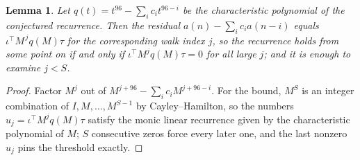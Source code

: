 \documentclass[11pt,a4paper]{article}
\theoremstyle{plain}
\newtheorem{lemma}[theorem]{Lemma}
\theoremstyle{definition}
\begin{document}
\begin{lemma}\label{lem:crit}
Let $q(t)=t^{96}-\sum_i c_it^{96-i}$ be the characteristic polynomial of the
conjectured recurrence. Then the residual $a(n)-\sum_ic_ia(n-i)$ equals
$\iota^{\!\top}M^{\,j}q(M)\tau$ for the corresponding walk index $j$, so the
recurrence holds from some point on if and only if $\iota^{\!\top}M^{j}q(M)\tau=0$ for all
large $j$; and it is enough to examine $j<S$.
\end{lemma}

\begin{proof}
Factor $M^{j}$ out of $M^{j+96}-\sum_ic_iM^{j+96-i}$. For the bound, $M^{S}$
is an integer combination of $I,M,\dots,M^{S-1}$ by Cayley--Hamilton, so the numbers
$u_j=\iota^{\!\top}M^{j}q(M)\tau$ satisfy the monic linear recurrence given by the
characteristic polynomial of $M$; $S$ consecutive zeros force every later one, and the last
nonzero $u_j$ pins the threshold exactly.
\end{proof}
\end{document}
